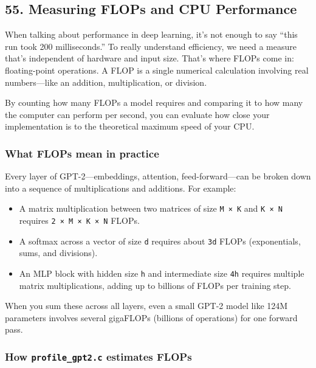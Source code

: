 \documentclass[
  letterpaper,
  DIV=11,
  numbers=noendperiod]{scrreprt}
\providecommand{\tightlist}{%
  \setlength{\itemsep}{0pt}\setlength{\parskip}{0pt}}
\begin{document}
\subsection{55. Measuring FLOPs and CPU
Performance}\label{measuring-flops-and-cpu-performance}

When talking about performance in deep learning, it's not enough to say
``this run took 200 milliseconds.'' To really understand efficiency, we
need a measure that's independent of hardware and input size. That's
where FLOPs come in: floating-point operations. A FLOP is a single
numerical calculation involving real numbers---like an addition,
multiplication, or division.

By counting how many FLOPs a model requires and comparing it to how many
the computer can perform per second, you can evaluate how close your
implementation is to the theoretical maximum speed of your CPU.

\subsubsection{What FLOPs mean in
practice}\label{what-flops-mean-in-practice}

Every layer of GPT-2---embeddings, attention, feed-forward---can be
broken down into a sequence of multiplications and additions. For
example:

\begin{itemize}
\tightlist
\item
  A matrix multiplication between two matrices of size \texttt{M\ ×\ K}
  and \texttt{K\ ×\ N} requires \texttt{2\ ×\ M\ ×\ K\ ×\ N} FLOPs.
\item
  A softmax across a vector of size \texttt{d} requires about
  \texttt{3d} FLOPs (exponentials, sums, and divisions).
\item
  An MLP block with hidden size \texttt{h} and intermediate size
  \texttt{4h} requires multiple matrix multiplications, adding up to
  billions of FLOPs per training step.
\end{itemize}

When you sum these across all layers, even a small GPT-2 model like 124M
parameters involves several gigaFLOPs (billions of operations) for one
forward pass.

\subsubsection{\texorpdfstring{How \texttt{profile\_gpt2.c} estimates
FLOPs}{How profile\_gpt2.c estimates FLOPs}}\label{how-profile_gpt2.c-estimates-flops}
\end{document}
